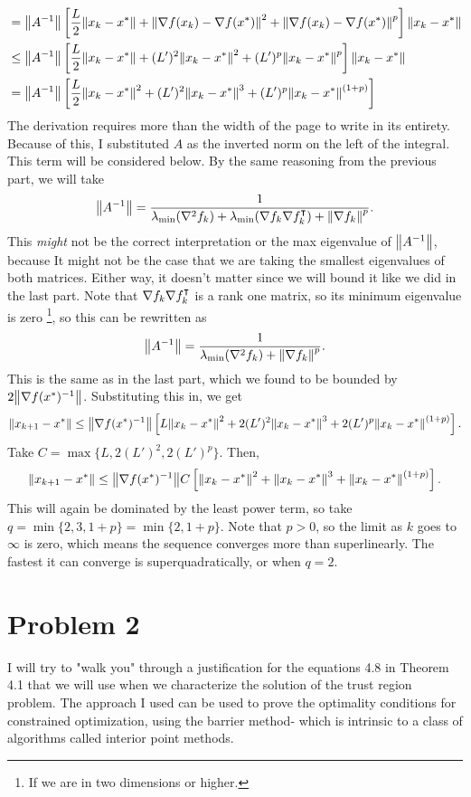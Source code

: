 \begin{solution}
{\begin{align*}
        &= \norm{A^{-1}}  \left[ \frac{L}{2} \norm{x_k - x^{*}} + \norm{\nabla f(x_k) - \nabla f(x^{*})}^2 + \norm{\nabla f(x_k) - \nabla f(x^{*})}^p\right]\norm{x_k - x^{*}}\\
        &\leq \norm{A^{-1}}  \left[ \frac{L}{2} \norm{x_k - x^{*}} + (L')^2\norm{x_k - x^{*}}^2 + (L')^p\norm{x_k - x^{*}}^p\right]\norm{x_k - x^{*}}\\
        &= \norm{A^{-1}}  \left[ \frac{L}{2} \norm{x_k - x^{*}}^2 + (L')^2\norm{x_k - x^{*}}^3 + (L')^p\norm{x_k - x^{*}}^{(1+p)}\right]\\ 
    \end{align*}
}
    \newpage
    The derivation requires more than the width of the page to write in its entirety. Because of this, I substituted $A$ as the inverted norm on the left of the integral. This term will be considered below. By the same reasoning from the previous part, we will take
    \[\norm{A^{-1}} = \frac{1}{\mathrm{\lambda}_{\min}(\nabla^2f_k) + \mathrm{\lambda}_{\min} (\nabla f_k \nabla f_k^\intercal ) + \norm{\nabla f_k}^p}.\]
    This \textit{might} not be the correct interpretation or the max eigenvalue of $\norm{A^{-1}}$, because It might not be the case that we are taking the smallest eigenvalues of both matrices. Either way, it doesn't matter since we will bound it like we did in the last part. Note that $\nabla f_k \nabla f_k^\intercal$ is a rank one matrix, so its minimum eigenvalue is zero \footnote{If we are in two dimensions or higher.}, so this can be rewritten as 
    \[\norm{A^{-1}} = \frac{1}{\mathrm{\lambda}_{\min}(\nabla^2f_k) + \norm{\nabla f_k}^p}.\]
    This is the same as in the last part, which we found to be bounded by $2\norm{\nabla f(x^{*})^{-1}}$. Substituting this in, we get
    \[\norm{x_{k+1} - x^{*}} \leq \norm{\nabla f(x^{*})^{-1}} \left[ L \norm{x_k - x^{*}}^2 + 2(L')^2\norm{x_k - x^{*}}^3 + 2(L')^p\norm{x_k - x^{*}}^{(1+p)}\right].\]
    Take $C = \max \{ L, 2(L')^2, 2(L')^p \}$. Then,
    \[\norm{x_{k+1} - x^{*}} \leq \norm{\nabla f(x^{*})^{-1}} C\left[ \norm{x_k - x^{*}}^2 + \norm{x_k - x^{*}}^3 + \norm{x_k - x^{*}}^{(1+p)}\right].\]
    This will again be dominated by the least power term, so take $q = \min \{ 2, 3, 1 + p\} = \min \{ 2, 1 + p\}$. Note that $p > 0$, so the limit as $k$ goes to $\infty$ is zero, which means the sequence converges more than superlinearly. The fastest it can converge is superquadratically, or when $q = 2$.
\end{solution}

\newpage
\section{Problem 2}
I will try to "walk you" through a justification for the equations 4.8 in Theorem 4.1 that we will use when we characterize the solution of the trust region problem. The approach I used can be used to prove the optimality conditions for constrained optimization, using the barrier method- which is intrinsic to a class of algorithms called interior point methods. 

